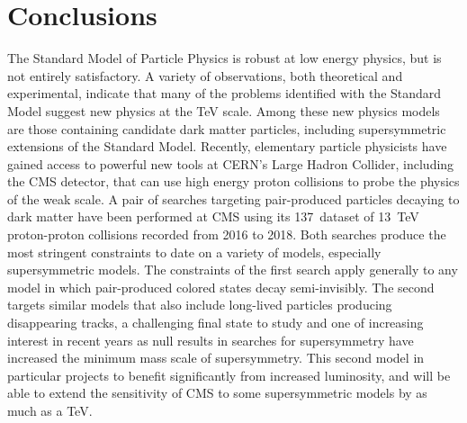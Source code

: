 \chapter{Conclusions}

The Standard Model of Particle Physics is robust at low energy physics, but is not entirely satisfactory.
A variety of observations, both theoretical and experimental, indicate that many of the problems identified with the Standard Model suggest new physics at the TeV scale.
Among these new physics models are those containing candidate dark matter particles, including supersymmetric extensions of the Standard Model.
Recently, elementary particle physicists have gained access to powerful new tools at CERN's Large Hadron Collider, including the CMS detector, that can use high energy proton collisions to probe the physics of the weak scale.
A pair of searches targeting pair-produced particles decaying to dark matter have been performed at CMS using its 137~\fbinv dataset of 13~TeV proton-proton collisions recorded from 2016 to 2018.
Both searches produce the most stringent constraints to date on a variety of models, especially supersymmetric models.
The constraints of the first search apply generally to any model in which pair-produced colored states decay semi-invisibly.
The second targets similar models that also include long-lived particles producing disappearing tracks, a challenging final state to study and one of increasing interest in recent years as null results in searches for supersymmetry have increased the minimum mass scale of supersymmetry.
This second model in particular projects to benefit significantly from increased luminosity, and will be able to extend the sensitivity of CMS to some supersymmetric models by as much as a TeV.
